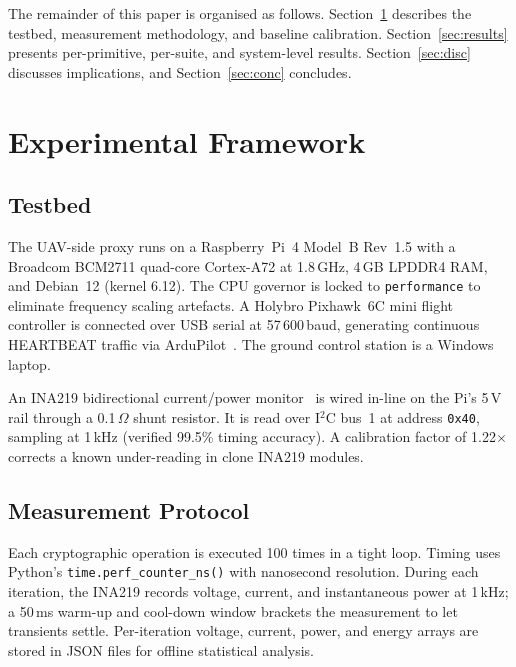 \documentclass[conference]{IEEEtran}
\begin{document}
The remainder of this paper is organised as follows.
Section~\ref{sec:method} describes the testbed, measurement
methodology, and baseline calibration.  Section~\ref{sec:results}
presents per-primitive, per-suite, and system-level results.
Section~\ref{sec:disc} discusses implications, and
Section~\ref{sec:conc} concludes.


\section{Experimental Framework}
\label{sec:method}

\subsection{Testbed}
\label{sec:testbed}

The UAV-side proxy runs on a Raspberry~Pi~4 Model~B Rev~1.5 with a
Broadcom BCM2711 quad-core Cortex-A72 at 1.8\,GHz, 4\,GB LPDDR4 RAM,
and Debian~12 (kernel 6.12).  The CPU governor is locked to
\texttt{performance} to eliminate frequency scaling artefacts.
A Holybro Pixhawk~6C mini flight controller is connected over USB
serial at 57\,600\,baud, generating continuous HEARTBEAT traffic via
ArduPilot~\cite{ardupilot}.  The ground control station is a
Windows laptop.

An INA219 bidirectional current/power monitor~\cite{ina219} is wired
in-line on the Pi's 5\,V rail through a 0.1\,$\Omega$ shunt resistor.
It is read over I$^2$C bus~1 at address \texttt{0x40}, sampling at
1\,kHz (verified 99.5\% timing accuracy).  A calibration factor of
1.22$\times$ corrects a known under-reading in clone INA219 modules.

\subsection{Measurement Protocol}
Each cryptographic operation is executed 100 times in a tight loop.
Timing uses Python's \texttt{time.perf\_counter\_ns()} with nanosecond
resolution.  During each iteration, the INA219 records voltage,
current, and instantaneous power at 1\,kHz; a 50\,ms warm-up and
cool-down window brackets the measurement to let transients settle.
Per-iteration voltage, current, power, and energy arrays are stored in
JSON files for offline statistical analysis.
\end{document}
